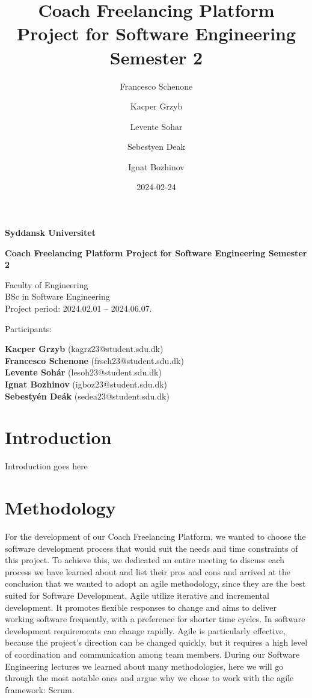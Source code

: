 \documentclass[12pt]{report}
\title{Coach Freelancing Platform Project for Software Engineering Semester 2}
\author{Francesco Schenone \and Kacper Grzyb \and Levente Sohar \and Sebestyen Deak \and Ignat Bozhinov}
\date{2024-02-24}
\begin{document}
\begin{titlepage}
\centering
\vspace*{1cm}

\Huge
\textbf{Syddansk Universitet}

\vspace{2cm}

\Huge
\textbf{Coach Freelancing Platform Project}
\textbf{for Software Engineering Semester 2}

\vfill

\large
Faculty of Engineering\\
BSc in Software Engineering\\
Project period: 2024.02.01 -- 2024.06.07.

\vfill
\begin{flushleft}  
    Participants: \\
\end{flushleft}

    \hfill \small{\textbf{Kacper Grzyb} (kagrz23@student.sdu.dk)} \\
    \hfill \small{\textbf{Francesco Schenone} (frsch23@student.sdu.dk)} \\
    \hfill \small{\textbf{Levente Sohár} (lesoh23@student.sdu.dk)} \\
    \hfill \small{\textbf{Ignat Bozhinov} (igboz23@student.sdu.dk)} \\
    \hfill \small{\textbf{Sebestyén Deák} (sedea23@student.sdu.dk)} \\

\end{titlepage}

\tableofcontents


\section{Introduction}
Introduction goes here

\section{Methodology}

For the development of our Coach Freelancing Platform, we wanted to choose the software development process that would suit the needs and time constraints of this project. To achieve this, we dedicated an entire meeting to discuss each process we have learned about and list their pros and cons and arrived at the conclusion that we wanted to adopt an agile methodology, since they are the best suited for Software Development. Agile utilize iterative and incremental development. It promotes flexible responses to change and aims to deliver working software frequently, with a preference for shorter time cycles. In software development requirements can change rapidly. Agile is particularly effective, because the project's direction can be changed quickly, but it requires a high level of coordination and communication among team members.
During our Software Engineering lectures we learned about many methodologies, here we will go through the most notable ones and argue why we chose to work with the agile framework: Scrum.
\end{document}
